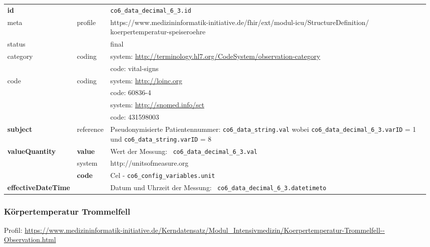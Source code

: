 \begin{longtable}{|l|l|p{7.5cm}|}
	\hline
	\rowcolor{lightgray} \multicolumn{3}{|l|}{Data Mapping (inhaltlich)} \\ \hline
	\textbf{id} &  & \texttt{co6\_data\_decimal\_6\_3.id} \\ \hline
	meta & profile & https://www.medizininformatik-initiative.de/fhir/ext/modul-icu/StructureDefinition/
	koerpertemperatur-speiseroehre \\ \hline 
	status &  & final   \\ \hline 
	category & coding & system: \url{http://terminology.hl7.org/CodeSystem/observation-category} \\
	\cline{3-3}
	& & code: vital-signs \\ \hline
	code & coding & system: \url{http://loinc.org} \\ 
	\cline{3-3} 
	&  & code: 60836-4 \\ 
	\cline{3-3} 
	&  & system: \url{http://snomed.info/sct} \\ 
	\cline{3-3}
	&  & code: 431598003 \\ \hline
	\textbf{subject} & reference & Pseudonymisierte Patientennummer: \texttt{co6\_data\_string.val} wobei \texttt{co6\_data\_decimal\_6\_3.varID} = 1 und \texttt{co6\_data\_string.varID} = 8 \\ \hline
	\textbf{valueQuantity}  & \textbf{value} & Wert der Messung: \texttt{
		co6\_data\_decimal\_6\_3.val} \\
	\cline{2-3}
	& system & http://unitsofmeasure.org \\
	\cline{2-3}
	& \textbf{code} & Cel - \texttt{co6\_config\_variables.unit} \\ \hline
	\textbf{effectiveDateTime}  & & Datum und Uhrzeit der Messung: \texttt{
		co6\_data\_decimal\_6\_3.datetimeto} \\ \hline
\end{longtable}

\subsubsection{Körpertemperatur Trommelfell}

Profil: \url{https://www.medizininformatik-initiative.de/Kerndatensatz/Modul_Intensivmedizin/Koerpertemperatur-Trommelfell--Observation.html}

